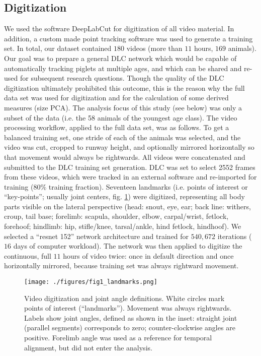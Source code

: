 \subsection{Digitization}
\label{sec:org3ecf574}
We used the software DeepLabCut \citep[DLC,][]{Mathis2018} for digitization of all video material.
In addition, a custom made point tracking software \citep{MMielke2020} was used to generate a training set.
In total, our dataset contained \(180\) videos (more than \(11\) hours, \(169\) animals).
Our goal was to prepare a general DLC network which would be capable of automatically tracking piglets at multiple ages, and which can be shared and re-used for subsequent research questions.
Though the quality of the DLC digitization ultimately prohibited this outcome, this is the reason why the full data set was used for digitization and for the calculation of some derived measures (size PCA).
The analysis focus of this study (see below) was only a subset of the data (i.e. the 58 animals of the youngest age class).
The video processing workflow, applied to the full data set, was as follows.
To get a balanced training set, one stride of each of the animals was selected, and the video was cut, cropped to runway height, and optionally mirrored horizontally so that movement would always be rightwards.
All videos were concatenated and submitted to the DLC training set generation.
DLC was set to select 2552 frames from these videos, which were tracked in an external software and re-imported for training (\(80 \%\) training fraction).
Seventeen landmarks (i.e. points of interest or ``key-points''; usually joint centers, fig. \ref{fig:landmarks}) were digitized, representing all body parts visible on the lateral perspective (head: snout, eye, ear; back line: withers, croup, tail base; forelimb: scapula, shoulder, elbow, carpal/wrist, fetlock, forehoof; hindlimb: hip, stifle/knee, tarsal/ankle, hind fetlock, hindhoof).
We selected a ``resnet 152'' network architecture and trained for \(540,672\) iterations (\(16\) days of computer workload).
The network was then applied to digitize the continuous, full \(11\) hours of video twice: once in default direction and once horizontally mirrored, because training set was always rightward movement.

\begin{figure}[t]
\centering
\texttt{[image: ./figures/fig1\_landmarks.png]}
\caption{\label{fig:landmarks}Video digitization and joint angle definitions. White circles mark points of interest (``landmarks''). Movement was always rightwards. Labels show joint angles, defined as shown in the inset: straight joint (parallel segments) corresponds to zero; counter-clockwise angles are positive. Forelimb angle was used as a reference for temporal alignment, but did not enter the analysis.}
\end{figure}




